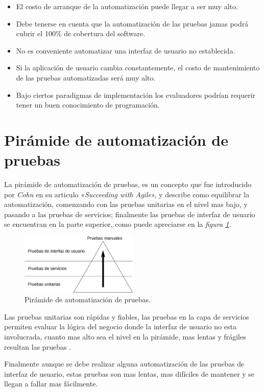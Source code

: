 \begin{itemize}
    \item El costo de arranque de la automatización puede llegar a ser muy alto.
    \item Debe tenerse en cuenta que la automatización de las pruebas jamas
        podrá cubrir el 100\% de cobertura del software.
    \item No es conveniente automatizar una interfaz de usuario no establecida.
    \item Si la aplicación de usuario cambia constantemente, el costo de
        mantenimiento de las pruebas automatizadas será muy alto.
    \item Bajo ciertos paradigmas de implementación los evaluadores podrían
        requerir tener un buen conocimiento de programación.
\end{itemize}

\section{Pirámide de automatización de pruebas}
La pirámide de automatización de pruebas, es un concepto que fue introducido
por \emph{Cohn} en su articulo «\emph{Succeeding with Agile}», y describe como
equilibrar la automatización, comenzando con las pruebas unitarias en el nivel
mas bajo, y pasando a las pruebas de servicios; finalmente las pruebas de
interfaz de usuario se encuentran en la parte superior, como puede apreciarse en
la \emph{figura \ref{piramide}}.

\begin{figure}[H]
\centering
\includegraphics[width=0.5\textwidth]{graphics/pyramid.eps}
\caption{Pirámide de automatización de pruebas.}
\label{piramide}
\end{figure}

Las pruebas unitarias son rápidas y fiables, las pruebas en la capa de servicios
permiten evaluar la lógica del negocio donde la interfaz de usuario no esta
involucrada, cuanto mas alto sea el nivel en la pirámide, mas lentas y frágiles
resultan las pruebas \cite{Cohn}.

Finalmente aunque se debe realizar alguna automatización de las pruebas de
interfaz de usuario, estas pruebas son mas lentas, mas difíciles de mantener y
se llegan a fallar mas fácilmente.

